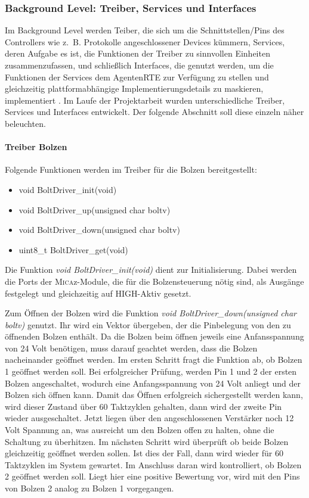 \subsubsection{Background Level: Treiber, Services und Interfaces}
Im Background Level werden Teiber, die sich um die Schnittstellen/Pins des Controllers wie z.~B. Protokolle angeschlossener Devices\cite[S. 26]{Stasch:Hahn} kümmern, Services, deren Aufgabe es ist, die Funktionen der Treiber zu sinnvollen Einheiten zusammenzufassen, und schließlich Interfaces, die genutzt werden, um die Funktionen der Services dem AgentenRTE zur Verfügung zu stellen und gleichzeitig plattformabhängige Implementierungsdetails zu maskieren, implementiert \cite[S. 26]{Stasch:Hahn}. Im Laufe der Projektarbeit wurden unterschiedliche Treiber, Services und Interfaces entwickelt. Der folgende Abschnitt soll diese einzeln näher beleuchten.

\paragraph{Treiber Bolzen}
Folgende Funktionen werden im Treiber für die Bolzen bereitgestellt:
\begin{itemize}
  \item void BoltDriver\_init(void)
  \item void BoltDriver\_up(unsigned char boltv)
  \item void BoltDriver\_down(unsigned char boltv)
  \item uint8\_t BoltDriver\_get(void)
\end{itemize} 
Die Funktion \textit{void BoltDriver\_init(void)} dient zur Initialisierung. Dabei werden die Ports der \textsc{Mica}z-Module, die für die Bolzensteuerung nötig sind, als Ausgänge festgelegt und gleichzeitig auf HIGH-Aktiv gesetzt.

Zum Öffnen der Bolzen wird die Funktion \textit{void BoltDriver\_down(unsigned char boltv)} genutzt. Ihr wird ein Vektor übergeben, der die Pinbelegung von den zu öffnenden Bolzen enthält. Da die Bolzen beim öffnen jeweils eine Anfansspannung von 24 Volt benötigen, muss darauf geachtet werden, dass die Bolzen nacheinander geöffnet werden. Im ersten Schritt fragt die Funktion ab, ob Bolzen 1 geöffnet werden soll. Bei erfolgreicher Prüfung, werden Pin 1 und 2 der ersten Bolzen angeschaltet, wodurch eine Anfangsspannung von 24 Volt anliegt und der Bolzen sich öffnen kann. Damit das Öffnen erfolgreich sichergestellt werden kann, wird dieser Zustand über 60 Taktzyklen gehalten, dann wird der zweite Pin wieder ausgeschaltet. Jetzt liegen über den angeschlossenen Verstärker noch 12 Volt Spannung an, was ausreicht um den Bolzen offen zu halten, ohne die Schaltung zu überhitzen. Im nächsten Schritt wird überprüft ob beide Bolzen gleichzeitig geöffnet werden sollen. Ist dies der Fall, dann wird wieder für 60 Taktzyklen im System gewartet. Im Anschluss daran wird kontrolliert, ob Bolzen 2 geöffnet werden soll. Liegt hier eine positive Bewertung vor, wird mit den Pins von Bolzen 2 analog zu Bolzen 1 vorgegangen.

